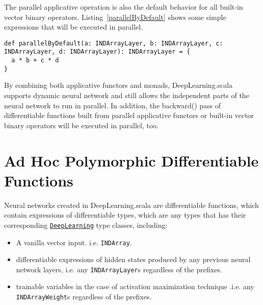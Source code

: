 The parallel applicative operation is also the default behavior for all built-in vector binary operators. Listing~\ref{parallelByDefault} shows some simple expressions that will be executed in parallel.

\begin{lstlisting}[float={h t b p},caption={By default, \lstinline{a * b} and \lstinline{c * d} will be executed in parallel because they are independent}, label={parallelByDefault}]
def parallelByDefault(a: INDArrayLayer, b: INDArrayLayer, c: INDArrayLayer, d: INDArrayLayer): INDArrayLayer = {
  a * b + c * d
}
\end{lstlisting}

By combining both applicative functors and monads, DeepLearning.scala supports dynamic neural network and still allows the independent parts of the neural network to run in parallel. In addition, the backward() pass of differentiable functions built from parallel applicative functors or built-in vector binary operators will be executed in parallel, too.

\section{Ad Hoc Polymorphic Differentiable Functions}
\label{Ad Hoc Polymorphism}

Neural networks created in DeepLearning.scala are \glspl{differentiable function}, which contain expressions of differentiable types, which are any types that has their corresponding \href{https://javadoc.io/page/com.thoughtworks.deeplearning/deeplearning_2.11/latest/com/thoughtworks/deeplearning/DeepLearning.html}{\lstinline{DeepLearning}} type classes, including:

\begin{itemize}
  
  \item A vanilla vector input. i.e. \lstinline{INDArray}.

  \item \Glspl{differentiable expression} of hidden states produced by any previous neural network layers, i.e. any \lstinline{INDArrayLayer}s regardless of the prefixes.
  
  \item \Glspl{trainable variable} in the case of activation maximization technique \cite{erhan2009visualizing}.i.e. any \lstinline{INDArrayWeight}s regardless of the prefixes.

\end{itemize}

